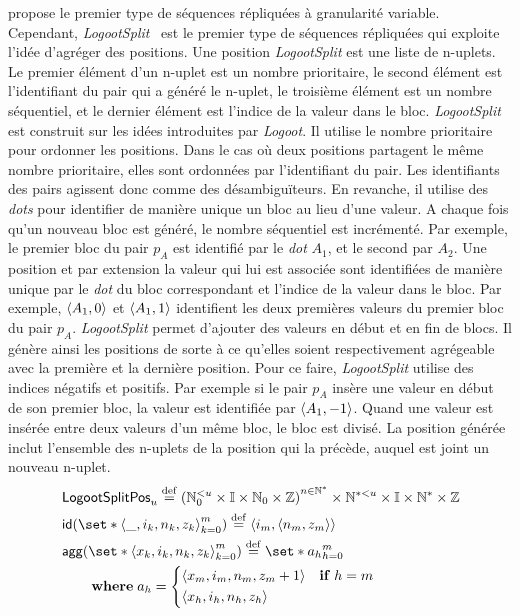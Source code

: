 \textcite{yu_2012_string-wise-crdt} propose le premier type de séquences répliquées à granularité variable.
Cependant, \emph{LogootSplit}~\cite{andre_2013_logootsplit} est le premier type de séquences répliquées qui exploite l'idée d'agréger des positions.
Une position \emph{LogootSplit} est une liste de n-uplets.
Le premier élément d'un n-uplet est un nombre prioritaire, le second élément est l'identifiant du pair qui a généré le n-uplet, le troisième élément est un nombre séquentiel, et le dernier élément est l'indice de la valeur dans le bloc.
\emph{LogootSplit} est construit sur les idées introduites par \emph{Logoot}.
Il utilise le nombre prioritaire pour ordonner les positions.
Dans le cas où deux positions partagent le même nombre prioritaire, elles sont ordonnées par l'identifiant du pair.
Les identifiants des pairs agissent donc comme des désambiguïteurs.
En revanche, il utilise des \emph{dots} pour identifier de manière unique un bloc au lieu d'une valeur.
A chaque fois qu'un nouveau bloc est généré, le nombre séquentiel est incrémenté.
Par exemple, le premier bloc du pair $p_A$ est identifié par le \emph{dot} $A_1$, et le second par $A_2$.
Une position et par extension la valeur qui lui est associée sont identifiées de manière unique par le \emph{dot} du bloc correspondant et l'indice de la valeur dans le bloc.
Par exemple, $\tuple*{A_1,0}$ et $\tuple*{A_1,1}$ identifient les deux premières valeurs du premier bloc du pair $p_A$.
\emph{LogootSplit} permet d'ajouter des valeurs en début et en fin de blocs.
Il génère ainsi les positions de sorte à ce qu'elles soient respectivement agrégeable avec la première et la dernière position.
Pour ce faire, \emph{LogootSplit} utilise des indices négatifs et positifs.
Par exemple si le pair $p_A$ insère une valeur en début de son premier bloc, la valeur est identifiée par $\tuple*{A_1,-1}$.
Quand une valeur est insérée entre deux valeurs d'un même bloc, le bloc est divisé.
La position générée inclut l'ensemble des n-uplets de la position qui la précède, auquel est joint un nouveau n-uplet.
%
\begin{align}
&\trm{LogootSplitPos}_u \defeq {(\mathbb{N}_0^{< u} \times \mathbb{I} \times \mathbb{N}_0 \times \mathbb{Z})}^{n \in \mathbb{N}^*} \times \mathbb{N}^{* < u} \times \mathbb{I} \times \mathbb{N}^* \times \mathbb{Z}\\
&\trm{id}(\set*{\tuple*{\_, i_k, n_k, z_k}}_{k=0}^m) \defeq \tuple*{i_m, \tuple*{n_m, z_m}}\\
&\begin{aligned}
    \MoveEqLeft \trm{agg}(\set*{\tuple*{x_k, i_k, n_k, z_k}}_{k=0}^m) \defeq \set*{a_h}_{h=0}^m\\
    &\where a_h = \begin{dcases}
        \tuple*{x_m, i_m, n_m, z_m + 1} & \when h = m\\
        \tuple*{x_h, i_h, n_h, z_h}
    \end{dcases}
\end{aligned}
\end{align}


